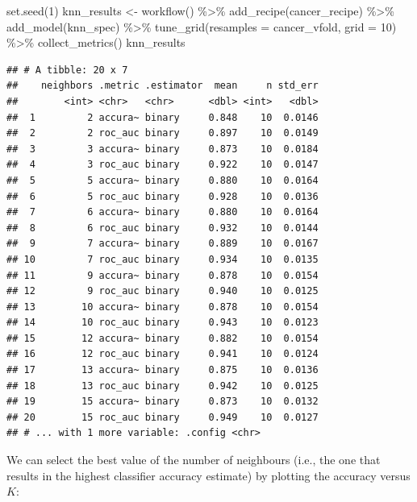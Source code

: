 \documentclass[
]{krantz}
\makeatletter
\newenvironment{Shaded}{\begin{snugshade}}{\end{snugshade}}
\newcommand{\AttributeTok}[1]{\textcolor[rgb]{0.61,0.61,0.61}{#1}}
\newcommand{\DecValTok}[1]{\textcolor[rgb]{0.06,0.06,0.06}{#1}}
\newcommand{\FunctionTok}[1]{\textcolor[rgb]{0,0,0}{#1}}
\newcommand{\NormalTok}[1]{#1}
\newcommand{\OtherTok}[1]{\textcolor[rgb]{0.37,0.37,0.37}{#1}}
\newcommand{\SpecialCharTok}[1]{\textcolor[rgb]{0,0,0}{#1}}
\newenvironment{kframe}{%
\medskip{}
\setlength{\fboxsep}{.8em}
 \def\at@end@of@kframe{}%
 \ifinner\ifhmode%
  \def\at@end@of@kframe{\end{minipage}}%
  \begin{minipage}{\columnwidth}%
 \fi\fi%
 \def\FrameCommand##1{\hskip\@totalleftmargin \hskip-\fboxsep
 \colorbox{shadecolor}{##1}\hskip-\fboxsep
     \hskip-\linewidth \hskip-\@totalleftmargin \hskip\columnwidth}%
 \MakeFramed {\advance\hsize-\width
   \@totalleftmargin\z@ \linewidth\hsize
   \@setminipage}}%
 {\par\unskip\endMakeFramed%
 \at@end@of@kframe}
\renewenvironment{Shaded}{\begin{kframe}}{\end{kframe}}
\makeatother
\begin{document}
\begin{Shaded}
\begin{Highlighting}[]
\FunctionTok{set.seed}\NormalTok{(}\DecValTok{1}\NormalTok{)}
\NormalTok{knn\_results }\OtherTok{\textless{}{-}} \FunctionTok{workflow}\NormalTok{() }\SpecialCharTok{\%\textgreater{}\%}
  \FunctionTok{add\_recipe}\NormalTok{(cancer\_recipe) }\SpecialCharTok{\%\textgreater{}\%}
  \FunctionTok{add\_model}\NormalTok{(knn\_spec) }\SpecialCharTok{\%\textgreater{}\%}
  \FunctionTok{tune\_grid}\NormalTok{(}\AttributeTok{resamples =}\NormalTok{ cancer\_vfold, }\AttributeTok{grid =} \DecValTok{10}\NormalTok{) }\SpecialCharTok{\%\textgreater{}\%}
  \FunctionTok{collect\_metrics}\NormalTok{()}
\NormalTok{knn\_results}
\end{Highlighting}
\end{Shaded}

\begin{verbatim}
## # A tibble: 20 x 7
##    neighbors .metric .estimator  mean     n std_err
##        <int> <chr>   <chr>      <dbl> <int>   <dbl>
##  1         2 accura~ binary     0.848    10  0.0146
##  2         2 roc_auc binary     0.897    10  0.0149
##  3         3 accura~ binary     0.873    10  0.0184
##  4         3 roc_auc binary     0.922    10  0.0147
##  5         5 accura~ binary     0.880    10  0.0164
##  6         5 roc_auc binary     0.928    10  0.0136
##  7         6 accura~ binary     0.880    10  0.0164
##  8         6 roc_auc binary     0.932    10  0.0144
##  9         7 accura~ binary     0.889    10  0.0167
## 10         7 roc_auc binary     0.934    10  0.0135
## 11         9 accura~ binary     0.878    10  0.0154
## 12         9 roc_auc binary     0.940    10  0.0125
## 13        10 accura~ binary     0.878    10  0.0154
## 14        10 roc_auc binary     0.943    10  0.0123
## 15        12 accura~ binary     0.882    10  0.0154
## 16        12 roc_auc binary     0.941    10  0.0124
## 17        13 accura~ binary     0.875    10  0.0136
## 18        13 roc_auc binary     0.942    10  0.0125
## 19        15 accura~ binary     0.873    10  0.0132
## 20        15 roc_auc binary     0.949    10  0.0127
## # ... with 1 more variable: .config <chr>
\end{verbatim}

We can select the best value of the number of neighbours (i.e., the one that results
in the highest classifier accuracy estimate) by plotting the accuracy versus \(K\):
\end{document}
